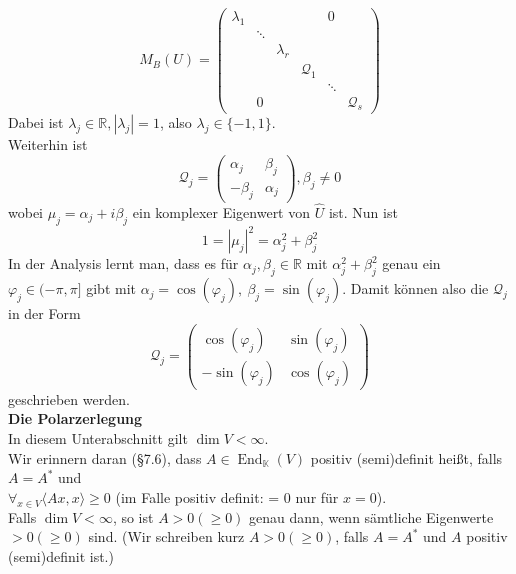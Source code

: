 \documentclass[12pt,a4paper]{article}
\theoremstyle{definition}
\theoremstyle{remark}
\renewcommand{\hat}[1]{\widehat{#1}}
\DeclareMathOperator{\End}{End}
\begin{document}
	\begin{equation}
		M_B(U) = \begin{pmatrix}
			\lambda_1 & & & &0 & \\
			& \ddots& &  & & \\
			 & &\lambda_r & & & \\
			& & & \mathcal{Q}_1 & &  \\
			& & & & \ddots&  \\
			& 0& & & & \mathcal{Q}_s
		\end{pmatrix}
	\end{equation}
	Dabei ist $\lambda_j \in \mathbb{R}, |\lambda_j|=1$, also $\lambda_j \in \{ -1,1 \}$. \\
	Weiterhin ist
	\begin{equation}
		\mathcal{Q}_j = \begin{pmatrix}
			\alpha_j & \beta_j \\
			-\beta_j & \alpha_j
		\end{pmatrix}, \beta_j \neq 0
	\end{equation}		
	wobei $\mu_j = \alpha_j +i \beta_j$ ein komplexer Eigenwert von $\hat{U}$ ist. Nun ist
	\begin{equation}
		1 = |\mu_j|^2 = \alpha_j^2+\beta_j^2
	\end{equation}
	In der Analysis lernt man, dass es für $\alpha_j, \beta_j \in \mathbb{R}$ mit $\alpha_j^2+ \beta_j^2$ genau ein $\varphi_j \in (-\pi,\pi]$ gibt mit $\alpha_j = \cos (\varphi_j), \ \beta_j = \sin( \varphi_j)$. Damit können also die $\mathcal{Q}_j$ in der Form
	\begin{equation}
		\mathcal{Q}_j = \begin{pmatrix}
			\cos( \varphi_j) & \sin( \varphi_j) \\
			-\sin (\varphi_j )& \cos (\varphi_j)
		\end{pmatrix}
	\end{equation}
	geschrieben werden. \\
	\textbf{Die Polarzerlegung} \\
	In diesem Unterabschnitt gilt $\dim V < \infty$. \\
	Wir erinnern daran (§7.6), dass $A \in \End_{\mathbb{K}}(V)$ positiv (semi)definit heißt, falls $A = A^*$ und \\ 
	 $\forall_{x \in V} \langle Ax,x \rangle \geq 0$ (im Falle positiv definit: = 0 nur für $x=0$). \\
	Falls $\dim V<\infty$, so ist $A>0(\geq 0)$ genau dann, wenn sämtliche Eigenwerte $>0(\geq 0)$ sind. (Wir schreiben kurz $A >0 (\geq 0)$, falls $A=A^*$ und $A$ positiv (semi)definit ist.)
\end{document}
